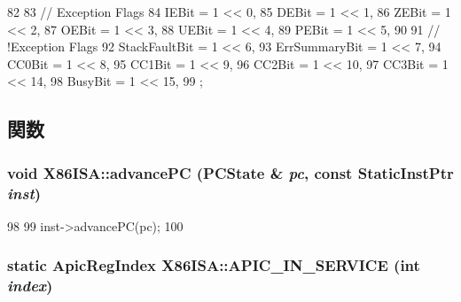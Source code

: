 \begin{DoxyCode}
82                       {
83         // Exception Flags
84         IEBit = 1 << 0,
85         DEBit = 1 << 1,
86         ZEBit = 1 << 2,
87         OEBit = 1 << 3,
88         UEBit = 1 << 4,
89         PEBit = 1 << 5,
90 
91         // !Exception Flags
92         StackFaultBit = 1 << 6,
93         ErrSummaryBit = 1 << 7,
94         CC0Bit = 1 << 8,
95         CC1Bit = 1 << 9,
96         CC2Bit = 1 << 10,
97         CC3Bit = 1 << 14,
98         BusyBit = 1 << 15,
99     };
\end{DoxyCode}


\subsection{関数}
\hypertarget{namespaceX86ISA_a9f66bf123d3bde93ad41499d68e98819}{
\subsubsection[{advancePC}]{\setlength{\rightskip}{0pt plus 5cm}void X86ISA::advancePC (PCState \& {\em pc}, \/  const {\bf StaticInstPtr} {\em inst})}}
\label{namespaceX86ISA_a9f66bf123d3bde93ad41499d68e98819}



\begin{DoxyCode}
98     {
99         inst->advancePC(pc);
100     }
\end{DoxyCode}
\hypertarget{namespaceX86ISA_a5c1e138a13b5dfdeed52ed0ebf585fe2}{
\subsubsection[{APIC\_\-IN\_\-SERVICE}]{\setlength{\rightskip}{0pt plus 5cm}static {\bf ApicRegIndex} X86ISA::APIC\_\-IN\_\-SERVICE (int {\em index})}}
\label{namespaceX86ISA_a5c1e138a13b5dfdeed52ed0ebf585fe2}



